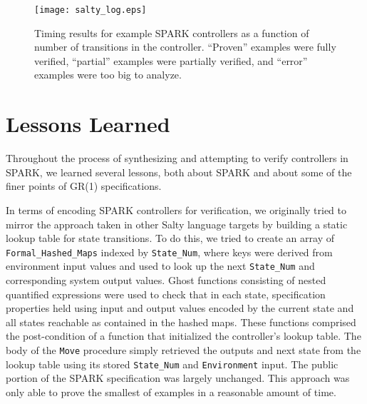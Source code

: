 \documentclass[runningheads]{llncs}
\begin{document}
\begin{figure}
\texttt{[image: salty\_log.eps]}
\caption{Timing results for example SPARK controllers as a function of number of transitions in the controller. ``Proven'' examples were fully verified, ``partial'' examples were partially verified, and ``error'' examples were too big to analyze.}
\label{fig:timingResults}
\end{figure}

\vspace{-1em}

\section{Lessons Learned}
\label{sec:lessonsLearned}

Throughout the process of synthesizing and attempting to verify controllers in SPARK, we learned several lessons, 
both about SPARK and about some of the finer points of GR(1) specifications.

In terms of encoding SPARK controllers for verification, we originally tried to 
mirror the approach taken in other Salty language targets by building a static lookup table for state transitions. 
To do this, we tried to create an array of \lstinline{Formal_Hashed_Maps} indexed by \lstinline{State_Num}, where keys 
were derived from environment input values and used to look up the next \lstinline{State_Num} and corresponding system output values. 
Ghost functions consisting of nested quantified expressions were used to check that in each state, specification properties held 
using input and output values encoded by the current state and all states reachable as contained in the hashed maps.
These functions comprised the post-condition of a function that initialized the controller's lookup table. 
The body of the \lstinline{Move} procedure simply retrieved the outputs and next state from the lookup table 
using its stored \lstinline{State_Num} and \lstinline{Environment} input.
The public portion of the SPARK specification was largely unchanged.
This approach was only able to prove the smallest of examples in a reasonable amount of time. 
\end{document}
